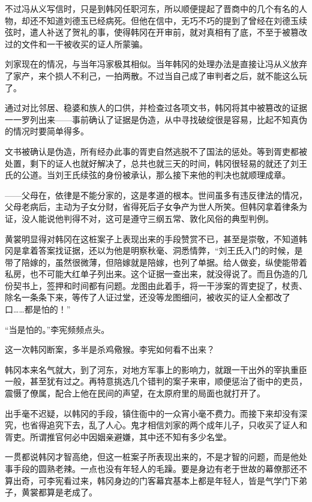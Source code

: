 不过冯从义写信时，只是到韩冈任职河东，所以顺便提起了晋商中的几个有名的人物，却还不知道刘德玉已经病死。但他在信中，无巧不巧的提到了曾经在刘德玉续弦时，遣人补送了贺礼的事，使得韩冈在开审前，就对真相有了底，不至于被篡改过的文件和一干被收买的证人所蒙骗。

刘家现在的情况，与当年冯家极其相似。当年韩冈的处理办法是直接让冯从义放弃了家产，来个损人不利己，一拍两散。不过当自己成了审判者之后，就不能这么玩了。

通过对比邻居、稳婆和族人的口供，并检查过各项文书，韩冈将其中被篡改的证据一一罗列出来——事前确认了证据是伪造，从中寻找破绽很是容易，比起不知真伪的情况时要简单得多。

文书被确认是伪造，所有经办此事的胥吏自然逃脱不了国法的惩处。等到胥吏都被处置，剩下的证人也就好解决了，总共也就三天的时间，韩冈很轻易的就还了刘王氏的公道。当刘王氏续弦的身份被承认，那么接下来他的判决也就顺理成章。

——父母在，依律是不能分家的，这是孝道的根本。世间虽多有违反律法的情况，父母老病后，主动为子女分财，省得死后子女争产为世人所笑。但韩冈拿着律条为证，没人能说他判得不对，这可是遵守三纲五常、敦化风俗的典型判例。

黄裳明显得对韩冈在这桩案子上表现出来的手段赞赏不已，甚至是崇敬，不知道韩冈是拿着答案找证据，还以为他是明察秋毫、洞悉情弊，“刘王氏入门的时候，是带了陪嫁的，虽然很微薄，但陪嫁就是陪嫁，也列了单据。给人做妾，纵使能带着私房，也不可能大红单子列出来。这个证据一查出来，就没得说了。而且伪造的几份契书上，签押和时间都有问题。龙图由此着手，将一干涉案的胥吏捉了，杖责、除名一条条下来，等传了人证过堂，还没等龙图细问，被收买的证人全都改了口……都是怕的！”

“当是怕的。”李宪频频点头。

这一次韩冈断案，多半是杀鸡儆猴。李宪如何看不出来？

韩冈本来名气就大，到了河东，对地方军事上的影响力，就跟一干出外的宰执重臣一般，甚至犹有过之。再特意挑选几个错判的案子来审，顺便惩治了衙中的吏员，震慑了僚属，配合上他在民间的声望，在太原府里的局面也就打开了。

出手毫不迟疑，以韩冈的手段，镇住衙中的一众宵小毫不费力。而接下来却没有深究，也省得追究下去，乱了人心。鬼才相信刘家的两个成年儿子，只收买了证人和胥吏。所谓推官何必中因姻亲避嫌，其中还不知有多少名堂。

一贯都说韩冈才智高绝，但这一桩案子所表现出来的，不是才智的问题，而是他处事手段的圆熟老辣。一点也没有年轻人的毛躁。要是身边有老于世故的幕僚那还不算出奇，可李宪看过来，韩冈身边的门客幕宾基本上都是年轻人，皆是气学门下弟子，黄裳都算是老成了。

